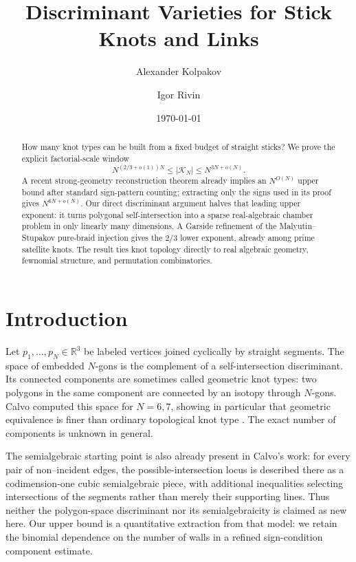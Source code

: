 \documentclass[11pt]{article}
\title{Discriminant Varieties for Stick Knots and Links}
\author{Alexander Kolpakov \and Igor Rivin}
\date{\today}
\theoremstyle{remark}
\theoremstyle{plain}
\newcommand{\R}{\mathbb{R}}
\newcommand{\Kcal}{\mathcal{K}}
\begin{document}
\maketitle

\begin{abstract}
How many knot types can be built from a fixed budget of straight sticks?  We
prove the explicit factorial-scale window
\[
 N^{(2/3+o(1))N}\le |\Kcal_N|\le N^{3N+o(N)}.
\]
A recent strong-geometry reconstruction theorem already implies an
\(N^{O(N)}\) upper bound after standard sign-pattern counting; extracting only
the signs used in its proof gives \(N^{6N+o(N)}\).  Our direct discriminant
argument halves that leading upper exponent: it turns polygonal
self-intersection into a sparse real-algebraic chamber problem in only
linearly many dimensions.  A Garside refinement of the Malyutin--Stupakov
pure-braid injection gives the \(2/3\) lower exponent, already among prime
satellite knots.  The result
ties knot topology directly to real algebraic geometry, fewnomial structure,
and permutation combinatorics.
\end{abstract}

\section{Introduction}

Let \(p_1,\ldots,p_N\in\R^3\) be labeled vertices joined cyclically by straight
segments.  The space of embedded \(N\)-gons is the complement of a
self-intersection discriminant.  Its connected components are sometimes called
geometric knot types: two polygons in the same component are connected by an
isotopy through \(N\)-gons.  Calvo computed this space for \(N=6,7\), showing in
particular that geometric equivalence is finer than ordinary topological knot
type \cite{Calvo}.  The exact number of components is unknown in general.

The semialgebraic starting point is also already present in Calvo's work:
for every pair of non--incident edges, the possible-intersection locus is
described there as a codimension-one cubic semialgebraic piece, with additional
inequalities selecting intersections of the segments rather than merely their
supporting lines.  Thus neither the polygon-space discriminant nor its
semialgebraicity is claimed as new here.  Our upper bound is a quantitative
extraction from that model: we retain the binomial dependence on the number of
walls in a refined sign-condition component estimate.
\end{document}
